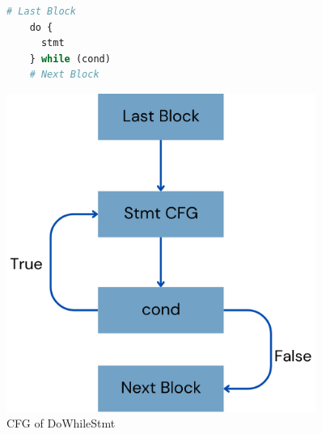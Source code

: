 \begin{figure}
  \centering
  \begin{minipage}{0.45\textwidth}
    \begin{lstlisting}[language=python]
    # Last Block
    do {
      stmt
    } while (cond)
    # Next Block
    \end{lstlisting}
  \end{minipage}%
  \hfill
  \begin{minipage}{0.225\textwidth}
    \centering
    \includegraphics[width=0.9\textwidth]{img/dowhilestmt-cfg.png}
  \end{minipage}
  \caption{CFG of DoWhileStmt}
\end{figure}


